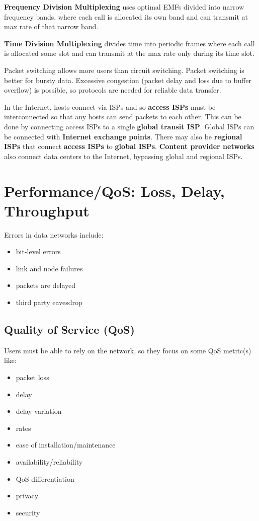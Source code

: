 \documentclass[11pt]{article}
\begin{document}
\textbf{Frequency Division Multiplexing} uses optimal EMFs divided into narrow frequency bands, where each call
is allocated its own band and can transmit at max rate of that narrow band.

\textbf{Time Division Multiplexing} divides time into periodic frames where each call is allocated some slot and
can transmit at the max rate only during its time slot.

Packet switching allows more users than circuit switching.
Packet switching is better for bursty data.
Excessive congestion (packet delay and loss due to buffer overflow) is possible, so protocols are needed
for reliable data transfer.

In the Internet, hosts connect via ISPs and so \textbf{access ISPs} must be interconnected so that any hosts
can send packets to each other.
This can be done by connecting access ISPs to a single \textbf{global transit ISP}.
Global ISPs can be connected with \textbf{Internet exchange points}.
There may also be \textbf{regional ISPs} that connect \textbf{access ISPs} to \textbf{global ISPs}.
\textbf{Content provider networks} also connect data centers to the Internet, bypassing global and regional ISPs.
\section{Performance/QoS: Loss, Delay, Throughput}
\label{sec:org8835def}
Errors in data networks include:
\begin{itemize}
\item bit-level errors
\item link and node failures
\item packets are delayed
\item third party eavesdrop
\end{itemize}
\subsection{Quality of Service (QoS)}
\label{sec:orgd4b6cdf}
Users must be able to rely on the network, so they focus on some QoS metric(s) like:
\begin{itemize}
\item packet loss
\item delay
\item delay variation
\item rates
\item ease of installation/maintenance
\item availability/reliability
\item QoS differentiation
\item privacy
\item security
\end{itemize}
\end{document}
